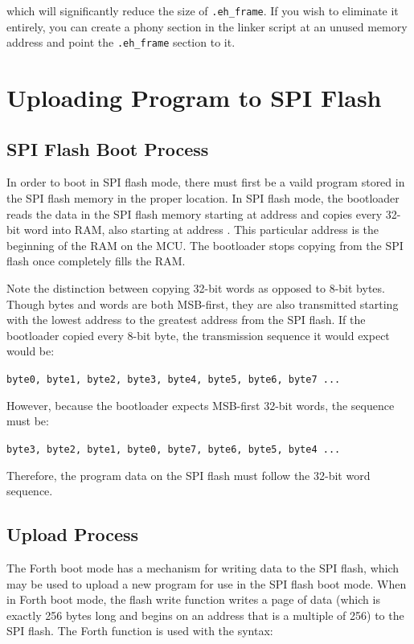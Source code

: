 \documentclass[11pt,pdftex,portrait,letterpaper]{article}
\begin{document}
\noindent{}

\noindent which will significantly reduce the size of \texttt{.eh\_frame}. If you wish to eliminate it entirely, you can create a phony section in the linker script at an unused memory address and point the \texttt{.eh\_frame} section to it.

\newpage



\section{Uploading Program to SPI Flash} \label{s:programming}

\subsection{SPI Flash Boot Process}
In order to boot in SPI flash mode, there must first be a vaild program stored in the SPI flash memory in the proper location. In SPI flash mode, the bootloader reads the data in the SPI flash memory starting at address \texttt{\SpiFlashProgramAddress} and copies every 32-bit word into RAM, also starting at address \texttt{\RamStartAddress}. This particular address is the beginning of the RAM on the MCU. The bootloader stops copying from the SPI flash once completely fills the RAM.

Note the distinction between copying 32-bit words as opposed to 8-bit bytes. Though bytes and words are both MSB-first, they are also transmitted starting with the lowest address to the greatest address from the SPI flash. If the bootloader copied every 8-bit byte, the transmission sequence it would expect would be:

\noindent\texttt{byte0, byte1, byte2, byte3, byte4, byte5, byte6, byte7 ...}

\noindent However, because the bootloader expects MSB-first 32-bit words, the sequence must be:

\noindent\texttt{byte3, byte2, byte1, byte0, byte7, byte6, byte5, byte4 ...}

\noindent Therefore, the program data on the SPI flash must follow the 32-bit word sequence.

\subsection{Upload Process}
The Forth boot mode has a mechanism for writing data to the SPI flash, which may be used to upload a new program for use in the SPI flash boot mode. When in Forth boot mode, the flash write  function writes a page of data (which is exactly 256 bytes long and begins on an address that is a multiple of 256) to the SPI flash. The Forth function is used with the syntax:
\end{document}

